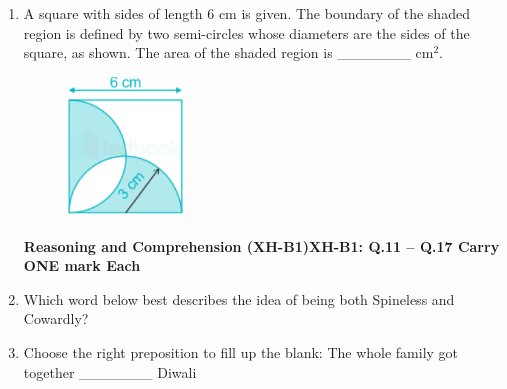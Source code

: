\documentclass[12pt]{article}
\theoremstyle{remark}
\begin{document}
\begin{enumerate}
\item A square with sides of length 6 cm is given. The boundary of the shaded region is defined by two semi-circles whose diameters are the sides of the square, as shown. The area of the shaded region is \_\_\_\_\_\_\_ cm$^2$.
\begin{figure}[H]
    \centering
    \includegraphics[width=0.3\textwidth]{Figs/Q10.png}
    \caption{}
    \label{fig:6.3}
\end{figure}
\begin{enumerate}
\end{enumerate}
\hfill{}
\newpage
\textbf{Reasoning and Comprehension (XH-B1)\newline XH-B1: Q.11 – Q.17 Carry ONE mark Each}
\item Which word below best describes the idea of being both Spineless and Cowardly?
\begin{enumerate}
\end{enumerate}
\hfill{}
\item Choose the right preposition to fill up the blank: The whole family got together \_\_\_\_\_\_\_ Diwali
\begin{enumerate}
\end{enumerate}
\end{enumerate}
\end{document}

